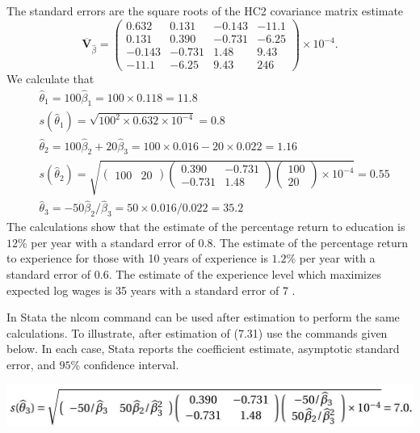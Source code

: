 \documentclass[10pt]{article}
\begin{document}
The standard errors are the square roots of the HC2 covariance matrix estimate
$$
\overline{\boldsymbol{V}}_{\widehat{\beta}}=\left(\begin{array}{cccc}
0.632 & 0.131 & -0.143 & -11.1 \\
0.131 & 0.390 & -0.731 & -6.25 \\
-0.143 & -0.731 & 1.48 & 9.43 \\
-11.1 & -6.25 & 9.43 & 246
\end{array}\right) \times 10^{-4} .
$$
We calculate that
$$
\begin{aligned}
& \widehat{\theta}_{1}=100 \widehat{\beta}_{1}=100 \times 0.118=11.8 \\
& s\left(\widehat{\theta}_{1}\right)=\sqrt{100^{2} \times 0.632 \times 10^{-4}}=0.8 \\
& \widehat{\theta}_{2}=100 \widehat{\beta}_{2}+20 \widehat{\beta}_{3}=100 \times 0.016-20 \times 0.022=1.16 \\
& s\left(\widehat{\theta}_{2}\right)=\sqrt{\left(\begin{array}{ll}100 & 20\end{array}\right)\left(\begin{array}{cc}0.390 & -0.731 \\-0.731 & 1.48\end{array}\right)\left(\begin{array}{c}100 \\20\end{array}\right) \times 10^{-4}}=0.55 \\
& \widehat{\theta}_{3}=-50 \widehat{\beta}_{2} / \widehat{\beta}_{3}=50 \times 0.016 / 0.022=35.2
\end{aligned}
$$
The calculations show that the estimate of the percentage return to education is $12 \%$ per year with a standard error of 0.8. The estimate of the percentage return to experience for those with 10 years of experience is $1.2 \%$ per year with a standard error of $0.6$. The estimate of the experience level which maximizes expected log wages is 35 years with a standard error of 7 .

In Stata the nlcom command can be used after estimation to perform the same calculations. To illustrate, after estimation of (7.31) use the commands given below. In each case, Stata reports the coefficient estimate, asymptotic standard error, and $95 \%$ confidence interval.

\includegraphics[max width=\textwidth]{2022_09_17_4fdd33cd9a12f3020189g-17(1)}
\end{document}
